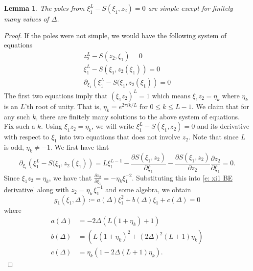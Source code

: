 \documentclass[a4paper,11pt]{article}
\newtheorem{lemma}[theorem]{Lemma}
\theoremstyle{definition}
\begin{document}
\begin{lemma}\label{l: xi_1 poles simple}
    The poles from $\xi_1^L-S(\xi_1,z_2)=0$ are simple except for finitely many values of $\Delta$. 
\end{lemma}
\begin{proof}
     If the poles were not simple, we would have the following system of equations
    \begin{equation}\label{e: system of eqs nonsimple xi1}
        \begin{split}
             z_2^L-S(z_2,\xi_1)=0 \\
            \xi_1^L-S(\xi_1,z_2(\xi_1))=0 \\
            \partial_{\xi_1}\left(\xi_1^L-S(\xi_1,z_2(\xi_1)\right)=0 
        \end{split}
    \end{equation}
    The first two equations imply that $(\xi_1 z_2)^L = 1$ which means $\xi_1 z_2 = \eta_k$ where $\eta_k$ is an $L$'th root of unity. That is, $\eta_k = e^{2\pi i k/L}$ for $0\leq k\leq L-1$. We claim that for any such $k$, there are finitely many solutions to the above system of equations. Fix such a $k$.
    Using $\xi_1 z_2  = \eta_k$, we will write $\xi_1^L-S(\xi_1,z_2)=0$ and its derivative with respect to $\xi_1$ into two equations that does not involve $z_2$. Note that since $L$ is odd, $\eta_k\neq -1$.
    We first have that \begin{equation}\label{e: xi1 BE derivative}
       \partial_{\xi_1}\left(\xi_1^L-S(\xi_1,z_2(\xi_1)\right)= L\xi_1^{L-1}-\frac{\partial S(\xi_1,z_2)}{\partial \xi_1} - \frac{\partial S(\xi_1,z_2)}{\partial z_2} \frac{\partial z_2}{\partial \xi_1}=0.
    \end{equation} 
    Since $\xi_1 z_2 = \eta_k$, we have that $\frac{\partial z_2}{\partial \xi_1} = -\eta_k \xi_1^{-2}$. Substituting this into \ref{e: xi1 BE derivative} along with $z_2=\eta_k \,\xi_1^{-1}$ and some algebra, we obtain 
    \begin{equation}
        g_1(\xi_1,\Delta) \coloneq  a(\Delta)\xi_1^2 + b(\Delta)\xi_1 + c(\Delta) = 0
    \end{equation}
where 
\begin{equation}
    \begin{split}
        a(\Delta) &=-2\Delta(L(1+\eta_k) + 1) \\ 
        b(\Delta)&= (L(1+\eta_k)^2 + (2\Delta)^2(L+1)\eta_k) \\
        c(\Delta) &= \eta_k(1-2\Delta(L+1)\eta_k). 
    \end{split}

\end{equation}
\end{proof}
\end{document}
